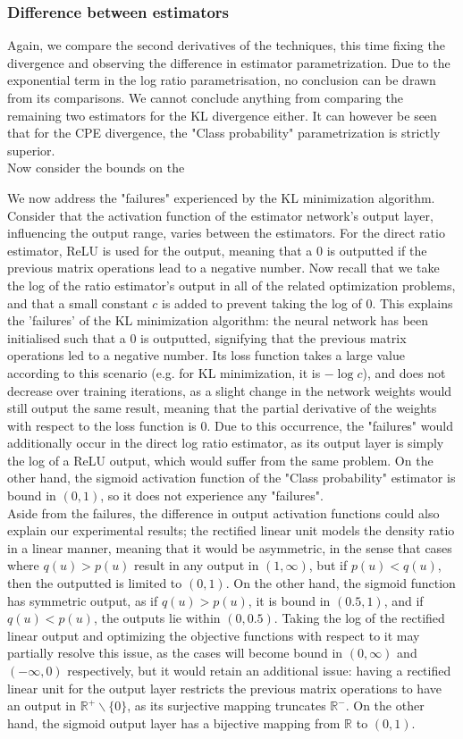 \documentclass[a4paper,12pt]{article}
\newcommand{\R}{\mathbb{R}}
\numberwithin{equation}{section}
\begin{document}
\subsubsection{Difference between estimators}
Again, we compare the second derivatives of the techniques, this time fixing the divergence and observing the difference in estimator parametrization. Due to the exponential term in the log ratio parametrisation, no conclusion can be drawn from its comparisons. We cannot conclude anything from comparing the remaining two estimators for the KL divergence either. It can however be seen that for the CPE divergence, the "Class probability" parametrization is strictly superior.\\
Now consider the bounds on the 

We now address the "failures" experienced by the KL minimization algorithm. Consider that the activation function of the estimator network's output layer, influencing the output range, varies between the estimators. For the direct ratio estimator, ReLU is used for the output, meaning that a 0 is outputted if the previous matrix operations lead to a negative number. Now recall that we take the log of the ratio estimator's output in all of the related optimization problems, and that a small constant $c$ is added to prevent taking the log of $0$. This explains the 'failures' of the KL minimization algorithm: the neural network has been initialised such that a $0$ is outputted, signifying that the previous matrix operations led to a negative number. Its loss function takes a large value according to this scenario (e.g. for KL minimization, it is $-\log c$), and does not decrease over training iterations, as a slight change in the network weights would still output the same result, meaning that the partial derivative of the weights with respect to the loss function is $0$. Due to this occurrence, the "failures" would additionally occur in the direct log ratio estimator, as its output layer is simply the log of a ReLU output, which would suffer from the same problem. On the other hand, the sigmoid activation function of the "Class probability" estimator is bound in $(0,1)$, so it does not experience any "failures".\\
Aside from the failures, the difference in output activation functions could also explain our experimental results; the rectified linear unit models the density ratio in a linear manner, meaning that it would be asymmetric, in the sense that cases where $q(u)>p(u)$ result in any output in $(1,\infty)$, but if $p(u)<q(u)$, then the outputted is limited to $(0,1)$. On the other hand, the sigmoid function has symmetric output, as if $q(u)>p(u)$, it is bound in $(0.5,1)$, and if $q(u)<p(u)$, the outputs lie within $(0,0.5)$. Taking the log of the rectified linear output and optimizing the objective functions with respect to it may partially resolve this issue, as the cases will become bound in $(0,\infty)$ and $(-\infty,0)$ respectively, but it would retain an additional issue: having a rectified linear unit for the output layer restricts the previous matrix operations to have an output in $\R^{+}\backslash \{0\}$, as its surjective mapping truncates $\R^-$. On the other hand, the sigmoid output layer has a bijective mapping from $\R$ to $(0,1)$.
\end{document}
